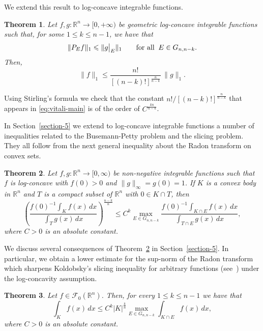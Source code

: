 \documentclass[11pt,leqno]{article}
\newtheorem{theorem}{Theorem}[section]
\theoremstyle{definition}
\theoremstyle{remark}
\numberwithin{equation}{section}
\newcommand{\ls}{\leqslant}
\newcommand{\1}{\textbf{1}}
\begin{document}
We extend this result to log-concave integrable functions.

\begin{theorem}\label{th:vitali}Let $f,g:{\mathbb R}^n\to [0,+\infty)$ be geometric log-concave integrable functions
such that, for some $1\ls k\ls n-1$, we have that
$$\|P_Ef\|_1\ls \|g\big|_E\|_1\qquad\hbox{for all}\;\;E\in G_{n,n-k}.$$
Then,
\begin{equation}\label{eq:vitali-main}\|f\|_1\ls \frac{n!}{[(n-k)!]^{\frac{n}{n-k}}}\,\|g\|_1.\end{equation}
\end{theorem}

Using Stirling's formula we check that the constant $n!/[(n-k)!]^{\frac{n}{n-k}}$ that appears in
\eqref{eq:vitali-main} is of the order of $C^{\frac{kn}{n-k}}$.

\smallskip

In Section~\ref{section-5} we extend to log-concave integrable functions a number of inequalities related to the Busemann-Petty problem and the slicing problem. They all follow from the next general inequality about the Radon transform on convex sets.


\begin{theorem}\label{th:radon-quotient}Let $f,g:{\mathbb R}^n\to [0,\infty)$ be non-negative integrable functions such that
$f$ is log-concave with $f(0)>0$ and $\|g\|_\infty=g(0)=1$.
If $K$ is a convex body in ${\mathbb R}^n$ and $T$ is a compact subset of ${\mathbb R}^n$ with $0\in K\cap T$, then
\begin{equation}\label{eq:radon-quotient}
\left(\frac{f(0)^{-1}\int_Kf(x)\,dx}{\int_T g(x)\,dx}\right)^{\frac{n-k}{n}}  \ls C^k
\max_{E\in G_{n,n-k}} \frac{f(0)^{-1}\int_{K\cap E} f(x)\,dx}{\int_{T\cap E} g(x)\,dx},
\end{equation}
where $C>0$ is an absolute constant.
\end{theorem}

We discuss several consequences of Theorem~\ref{th:radon-quotient} in Section~\ref{section-5}. In particular,
we obtain a lower estimate for the sup-norm of the Radon transform which sharpens Koldobsky's slicing inequality
for arbitrary functions (see~\cite{Koldobsky-AIM-2015}) under the log-concavity assumption.

\begin{theorem}\label{th:intro-slicing}Let $f\in {\mathcal F}_0({\mathbb R}^n)$. Then, for every $1\ls k\ls n-1$ we have that
$$\int_Kf(x)\,dx\ls C^k |K|^{\frac kn}\max_{E\in G_{n,n-k}} \int_{K\cap E} f(x)\,dx,$$
where $C>0$ is an absolute constant.
\end{theorem}
\end{document}
